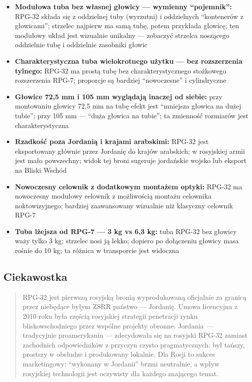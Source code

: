 \documentclass[12pt,oneside]{book}
\providecommand{\tightlist}{%
  \setlength{\itemsep}{0pt}\setlength{\parskip}{0pt}}
\begin{document}
\begin{itemize}
\tightlist
\item
  \textbf{Modułowa tuba bez własnej głowicy --- wymienny ``pojemnik'':}
  RPG-32 składa się z oddzielnej tuby (wyrzutni) i oddzielnych
  ``kontenerów z głowicami''; strzelec najpierw ma samą tubę, potem
  przykłada głowicę; ten modułowy układ jest wizualnie unikalny ---
  zobaczyć strzelca noszącego oddzielnie tubę i oddzielnie zasobniki
  głowic
\item
  \textbf{Charakterystyczna tuba wielokrotnego użytku --- bez
  rozszerzenia tylnego:} RPG-32 ma prostą tubę bez charakterystycznego
  stożkowego rozszerzenia RPG-7; proporcje są bardziej ``nowoczesne'' i
  cylindryczne
\item
  \textbf{Głowice 72,5 mm i 105 mm wyglądają inaczej od siebie:} przy
  montowaniu głowicy 72,5 mm na tubę efekt jest ``mniejsza głowica na
  dużej tubie''; przy 105 mm --- ``duża głowica na tubie''; ta zmienność
  rozmiarów jest charakterystyczna
\item
  \textbf{Rzadkość poza Jordanią i krajami arabskimi:} RPG-32 jest
  eksportowany głównie przez Jordanię do krajów arabskich; w rosyjskiej
  armii jest mało powszechny; widok tej broni sugeruje jordańskie wojsko
  lub eksport na Bliski Wschód
\item
  \textbf{Nowoczesny celownik z dodatkowym montażem optyki:} RPG-32 ma
  nowoczesny modułowy celownik z możliwością montażu celownika
  noktowizyjnego; bardziej zaawansowany wizualnie niż klasyczny celownik
  RPG-7
\item
  \textbf{Tuba lżejsza od RPG-7 --- 3 kg vs 6,3 kg:} tuba RPG-32 bez
  głowicy waży tylko 3 kg; strzelec nosi ją lekko; dopiero po dołączeniu
  głowicy masa rośnie do 10 kg; ta różnica w transporcie jest widoczna
\end{itemize}

\subsection{Ciekawostka}\label{ciekawostka-90}

\begin{quote}
RPG-32 jest pierwszą rosyjską bronią wyprodukowaną oficjalnie za granicą
przez niebędące byłym ZSRR państwo --- Jordanię. Umowa licencyjna z 2010
roku była częścią rosyjskiej strategii penetracji rynku
bliskowschodniego przez wspólne projekty obronne. Jordania ---
tradycyjnie proamerykanin --- zdecydowała się na rosyjski RPG-32 zamiast
zachodnich odpowiedników z przyczyn czysto pragmatycznych: był tańszy,
prostszy w obsłudze i produkowany lokalnie. Dla Rosji to sukces
marketingowy: ``wykonany w Jordanii'' brzmi neutralnie, a wpływ
rosyjskiej technologii jest oczywisty dla każdego znającego temat.
\end{quote}
\end{document}
